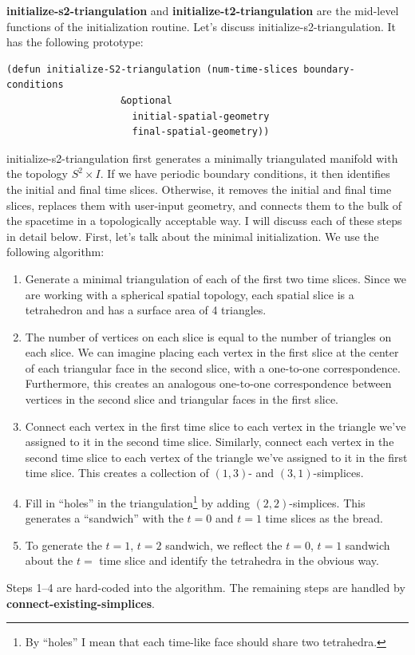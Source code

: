 \documentclass[12pt]{article}
\begin{document}
\textbf{initialize-s2-triangulation} and
\textbf{initialize-t2-triangulation} are the mid-level functions of
the initialization routine. Let's discuss
initialize-s2-triangulation. It has the following prototype:
\begin{small}
\begin{lstlisting}
(defun initialize-S2-triangulation (num-time-slices boundary-conditions 
				    &optional 
				      initial-spatial-geometry
				      final-spatial-geometry))
\end{lstlisting}
\end{small}
initialize-s2-triangulation first generates a minimally triangulated
manifold with the topology $S^2\times I$. If we have periodic boundary
conditions, it then identifies the initial and final time
slices. Otherwise, it removes the initial and final time slices,
replaces them with user-input geometry, and connects them to the bulk
of the spacetime in a topologically acceptable way. I will discuss
each of these steps in detail below. First, let's talk about the
minimal initialization. We use the following algorithm:
\begin{enumerate}
\item Generate a minimal triangulation of each of the first two time
  slices. Since we are working with a spherical spatial topology, each
  spatial slice is a tetrahedron and has a surface area of 4
  triangles.
\item The number of vertices on each slice is equal to the number of
  triangles on each slice. We can imagine placing each vertex in the
  first slice at the center of each triangular face in the second
  slice, with a one-to-one correspondence. Furthermore, this creates
  an analogous one-to-one correspondence between vertices in the
  second slice and triangular faces in the first slice.
\item Connect each vertex in the first time slice to each vertex in
  the triangle we've assigned to it in the second time
  slice. Similarly, connect each vertex in the second time slice to
  each vertex of the triangle we've assigned to it in the first time
  slice. This creates a collection of $(1,3)$- and $(3,1)$-simplices.
\item Fill in ``holes'' in the triangulation\footnote{By ``holes'' I
    mean that each time-like face should share two tetrahedra.} by
  adding $(2,2)$-simplices. This generates a ``sandwich'' with the
  $t=0$ and $t=1$ time slices as the bread.
\item To generate the $t=1$, $t=2$ sandwich, we reflect the $t=0$,
  $t=1$ sandwich about the $t=$ time slice and identify the tetrahedra
  in the obvious way.
\end{enumerate}
Steps 1--4 are hard-coded into the algorithm. The remaining steps are
handled by \textbf{connect-existing-simplices}.
\end{document}
